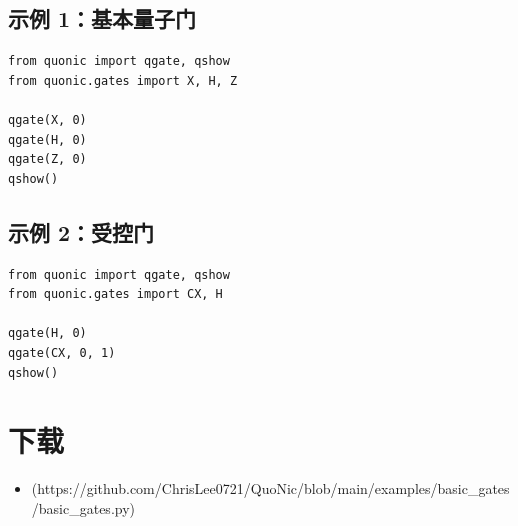 \documentclass[12pt,a4paper]{article}
\begin{document}
\subsection{示例 1：基本量子门}

\begin{verbatim}
from quonic import qgate, qshow
from quonic.gates import X, H, Z

qgate(X, 0)
qgate(H, 0)
qgate(Z, 0)
qshow()
\end{verbatim}

\subsection{示例 2：受控门}

\begin{verbatim}
from quonic import qgate, qshow
from quonic.gates import CX, H

qgate(H, 0)
qgate(CX, 0, 1)
qshow()
\end{verbatim}

\section{下载}

\begin{itemize}
  \item [basic\_gates.py](https://github.com/ChrisLee0721/QuoNic/blob/main/examples/basic_gates/basic_gates.py)
\end{itemize}
\end{document}
